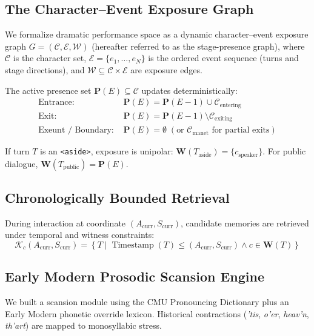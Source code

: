 \documentclass[sn-basic, referee]{sn-jnl}
\begin{document}
\subsection{The Character--Event Exposure Graph}\label{sec3.2}
We formalize dramatic performance space as a dynamic character--event exposure graph $G = (\mathcal{C}, \mathcal{E}, \mathcal{W})$ (hereafter referred to as the stage-presence graph), where $\mathcal{C}$ is the character set, $\mathcal{E} = \{e_1,\dots,e_N\}$ is the ordered event sequence (turns and stage directions), and $\mathcal{W} \subseteq \mathcal{C} \times \mathcal{E}$ are exposure edges.

The active presence set $\mathbf{P}(E) \subseteq \mathcal{C}$ updates deterministically:
\begin{align}
\text{Entrance: } & \mathbf{P}(E) = \mathbf{P}(E-1) \cup \mathcal{C}_{\text{entering}} \\
\text{Exit: } & \mathbf{P}(E) = \mathbf{P}(E-1) \setminus \mathcal{C}_{\text{exiting}} \\
\text{Exeunt / Boundary: } & \mathbf{P}(E) = \emptyset \; (\text{or } \mathcal{C}_{\text{manet}} \text{ for partial exits})
\end{align}

If turn $T$ is an \texttt{<aside>}, exposure is unipolar: $\mathbf{W}(T_{\text{aside}}) = \{c_{\text{speaker}}\}$. For public dialogue, $\mathbf{W}(T_{\text{public}}) = \mathbf{P}(E)$.

\subsection{Chronologically Bounded Retrieval}
During interaction at coordinate $(A_{\text{curr}}, S_{\text{curr}})$, candidate memories are retrieved under temporal and witness constraints:
\begin{equation}
\mathcal{K}_c(A_{\text{curr}}, S_{\text{curr}}) = \left\{ T \mid \operatorname{Timestamp}(T) \le (A_{\text{curr}}, S_{\text{curr}}) \land c \in \mathbf{W}(T) \right\}
\end{equation}

\subsection{Early Modern Prosodic Scansion Engine}
We built a scansion module using the CMU Pronouncing Dictionary plus an Early Modern phonetic override lexicon. Historical contractions (\textit{'tis}, \textit{o'er}, \textit{heav'n}, \textit{th'art}) are mapped to monosyllabic stress.
\end{document}
